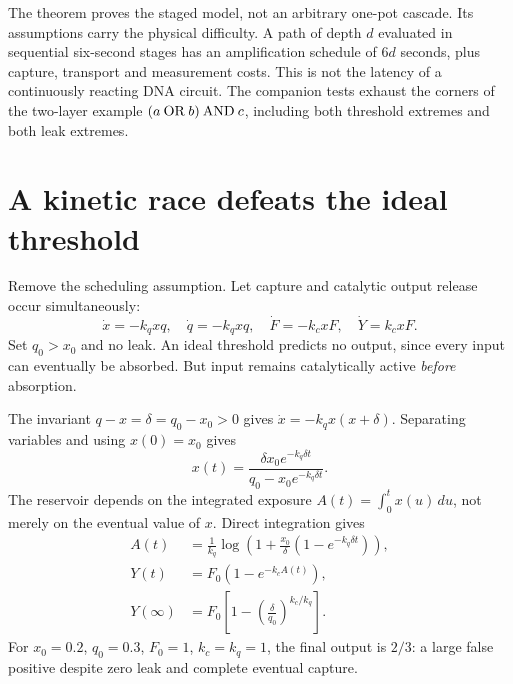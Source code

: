 The theorem proves the staged model, not an arbitrary one-pot cascade.
Its assumptions carry the physical difficulty. A path of depth $d$ evaluated
in sequential six-second stages has an amplification schedule of $6d$ seconds,
plus capture, transport and measurement costs. This is not the latency of a
continuously reacting DNA circuit. The companion tests exhaust the corners of
the two-layer example $(a\mathbin{\rm OR}b)\mathbin{\rm AND}c$, including both
threshold extremes and both leak extremes.

\section{A kinetic race defeats the ideal threshold}

Remove the scheduling assumption. Let capture and catalytic output release
occur simultaneously:
\begin{equation}
 \dot x=-k_qxq,\quad \dot q=-k_qxq,\quad
 \dot F=-k_cxF,\quad \dot Y=k_cxF .
 \label{eq:race}
\end{equation}
Set $q_0>x_0$ and no leak. An ideal threshold predicts no output, since every
input can eventually be absorbed. But input remains catalytically active
\emph{before} absorption.


The invariant $q-x=\delta=q_0-x_0>0$ gives
$\dot x=-k_qx(x+\delta)$. Separating variables and using $x(0)=x_0$ gives
\begin{equation}
 x(t)=\frac{\delta x_0e^{-k_q\delta t}}
                 {q_0-x_0e^{-k_q\delta t}}.
\end{equation}
The reservoir depends on the integrated exposure
$A(t)=\int_0^t x(u)\,du$, not merely on the eventual value of $x$. Direct
integration gives
\begin{align}
 A(t)&=\frac1{k_q}
 \log\left(1+\frac{x_0}{\delta}(1-e^{-k_q\delta t})\right),\\
 Y(t)&=F_0(1-e^{-k_cA(t)}),\\
 Y(\infty)&=F_0\left[1-\left(\frac{\delta}{q_0}\right)^{k_c/k_q}\right].
 \label{eq:race-limit}
\end{align}
For $x_0=0.2$, $q_0=0.3$, $F_0=1$, $k_c=k_q=1$, the final output is $2/3$:
a large false positive despite zero leak and complete eventual capture.

